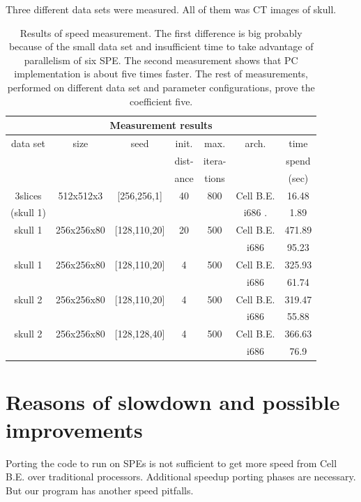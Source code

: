 Three different data sets were measured.
All of them was CT images of skull.

\begin{table}
\centering
\begin{tabular}{|c|c|c|c|c|c|c|}
\hline
\multicolumn{7}{|c|}{Measurement results}\\
\hline
data set		&size		&seed		&init.		&max. 		&arch.		&time\\
			&		&		&dist-		&itera-		&		&spend\\
			&		&		&ance		&tions		&		&(sec)\\
\hline
\hline
3slices 		&512x512x3	&[256,256,1]	&40		&800		&Cell B.E.	&16.48\\
(skull 1)		&		&		&		&		&i686	.	&1.89\\
\hline
\hline
skull 1			&256x256x80	&[128,110,20]	&20		&500		&Cell B.E.	&471.89\\
			&		&		&		&		&i686		&95.23\\
\hline
\hline
skull 1			&256x256x80	&[128,110,20]	&4		&500		&Cell B.E.	&325.93\\
			&		&		&		&		&i686		&61.74\\
\hline
\hline
skull 2			&256x256x80	&[128,110,20]	&4		&500		&Cell B.E.	&319.47\\
			&		&		&		&		&i686		&55.88\\
\hline
\hline
skull 2			&256x256x80	&[128,128,40]	&4		&500		&Cell B.E.	&366.63\\
			&		&		&		&		&i686		&76.9\\
\hline
\end{tabular}
\par
\caption[Measurement results]
{
Results of speed measurement.
The first difference is big probably because of the small data set and insufficient time to take advantage of parallelism of six SPE.
The second measurement shows that PC implementation is about five times faster.
The rest of measurements, performed on different data set and parameter configurations, prove the coefficient five.
}
\label{tab:runresults}
\end{table}

\section{Reasons of slowdown and possible improvements}

\par
Porting the code to run on SPEs is not sufficient to get more speed from Cell B.E. over traditional processors.
Additional speedup porting phases are necessary.
But our program has another speed pitfalls.

